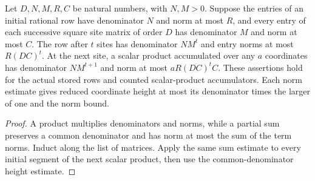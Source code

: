 \begin{lemma}
    \label{lem:lvv_contraction_intermediate_bounds}
    \leanok
    Let $D,N,M,R,C$ be natural numbers, with $N,M>0$.
    Suppose the entries of an initial rational row have denominator $N$
    and norm at most $R$, and every entry of each successive square
    site matrix of order $D$ has denominator $M$ and norm at most $C$.
    The row after $t$ sites has denominator $NM^t$ and entry norms at most
    $R(DC)^t$. At the next site, a scalar product accumulated over any
    $a$ coordinates has denominator $NM^{t+1}$ and norm at most
    $aR(DC)^tC$. These assertions hold for the actual stored rows and
    counted scalar-product accumulators.
    Each norm estimate gives reduced coordinate height at most its
    denominator times the larger of one and the norm bound.
\end{lemma}
\begin{proof}\leanok
    A product multiplies denominators and norms, while a partial sum
    preserves a common denominator and has norm at most the sum of the
    term norms. Induct along the list of matrices. Apply the same sum
    estimate to every initial segment of the next scalar product, then
    use the common-denominator height estimate.
\end{proof}

